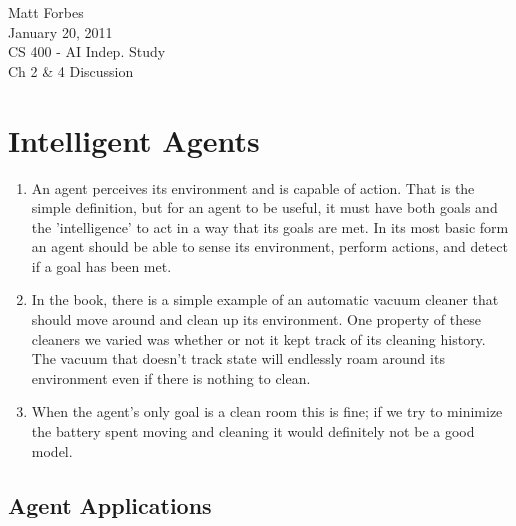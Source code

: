 \documentclass[a4paper,12pt]{article}
\begin{document}
Matt Forbes \\
January 20, 2011 \\
CS 400 - AI Indep. Study \\
Ch 2 \& 4 Discussion

\section*{Intelligent Agents}

\begin{enumerate}[]
\item An agent perceives its environment and is capable of
  action. That is the simple definition, but for an agent to be
  useful, it must have both goals and the 'intelligence' to act in a
  way that its goals are met. In its most basic form an agent should
  be able to sense its environment, perform actions, and detect if a
  goal has been met.
  
\item In the book, there is a simple example of an automatic vacuum
  cleaner that should move around and clean up its environment. One
  property of these cleaners we varied was whether or not it kept
  track of its cleaning history. The vacuum that doesn't track state
  will endlessly roam around its environment even if there is nothing
  to clean.
  
\item When the agent's only goal is a clean room this is fine; if we
  try to minimize the battery spent moving and cleaning it would
  definitely not be a good model. 
  
\end{enumerate}

\subsection*{Agent Applications}
\end{document}
